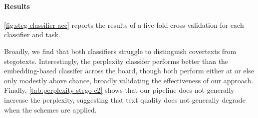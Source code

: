 \paragraph{Results} \autoref{fig:steg-classifier-acc} reports the results of a five-fold cross-validation for each classifier and task. 

Broadly, we find that both classifiers struggle to distinguish covertexts from stegotexts. Interestingly, the perplexity classifer performs better than the embedding-based classifer across the board, though both perform either at or else only modestly above chance, broadly validating the effectiveness of our approach. Finally, \autoref{tab:perplexity-stego-c2} shows that our pipeline does not generally increase the perplexity, suggesting that text quality does not generally degrade when the schemes are applied.







%  


